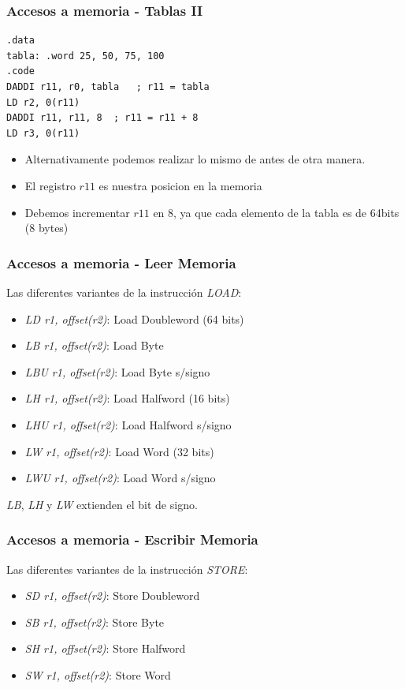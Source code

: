 \documentclass{beamer}
\begin{document}
\begin{frame}[fragile]
\frametitle{Accesos a memoria - Tablas II}
\begin{block}{}
\begin{lstlisting}[language=WinMIPS64,basicstyle=\ttfamily,keywordstyle=\color{blue}]
.data
tabla: .word 25, 50, 75, 100
.code
DADDI r11, r0, tabla   ; r11 = tabla
LD r2, 0(r11)
DADDI r11, r11, 8  ; r11 = r11 + 8
LD r3, 0(r11)
\end{lstlisting}
\end{block}

\begin{itemize}
\item Alternativamente podemos realizar lo mismo de antes de otra manera.
\item El registro $r11$ es nuestra posicion en la memoria
\item Debemos incrementar $r11$ en 8, ya que cada elemento de la tabla es de 64bits (8 bytes)
\end{itemize}
\end{frame}



\begin{frame}
\frametitle{Accesos a memoria - Leer Memoria}
Las diferentes variantes de la instrucción \emph{LOAD}:
\begin{itemize}
\item \emph{LD r1, offset(r2)}: Load Doubleword (64 bits)
\item \emph{LB r1, offset(r2)}: Load Byte
\item \emph{LBU r1, offset(r2)}: Load Byte s/signo
\item \emph{LH r1, offset(r2)}: Load Halfword (16 bits)
\item \emph{LHU r1, offset(r2)}: Load Halfword s/signo
\item \emph{LW r1, offset(r2)}: Load Word (32 bits)
\item \emph{LWU r1, offset(r2)}: Load Word s/signo
\end{itemize}
\emph{LB}, \emph{LH} y \emph{LW} extienden el bit de signo.
\end{frame}

\begin{frame}
\frametitle{Accesos a memoria - Escribir Memoria}
Las diferentes variantes de la instrucción \emph{STORE}:
\begin{itemize}
\item \emph{SD r1, offset(r2)}: Store Doubleword
\item \emph{SB r1, offset(r2)}: Store Byte
\item \emph{SH r1, offset(r2)}: Store Halfword
\item \emph{SW r1, offset(r2)}: Store Word
\end{itemize}
\end{frame}
\end{document}
